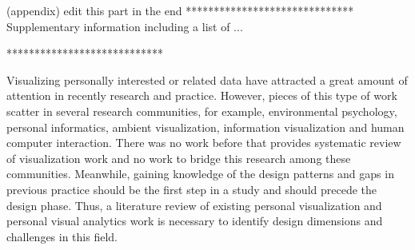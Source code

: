 \documentclass[12pt,oneside]{book}
\begin{document}
(appendix) edit this part in the end
******************************
Supplementary information including a list of ...



****************************


\label{chap:pva}
Visualizing personally interested or related data have attracted a great amount of attention in recently research and practice.  However, pieces of this type of work scatter in several research communities, for example, environmental psychology, personal informatics, ambient visualization, information visualization and human computer interaction.  There was no work before that provides systematic review of visualization work and no work to bridge this research among these communities.  Meanwhile, gaining knowledge of the design patterns and gaps in previous practice should be the first step in a study and should precede the design phase.  Thus, a literature review of existing personal visualization and personal visual analytics work is necessary to identify design dimensions and challenges in this field. 
\end{document}
